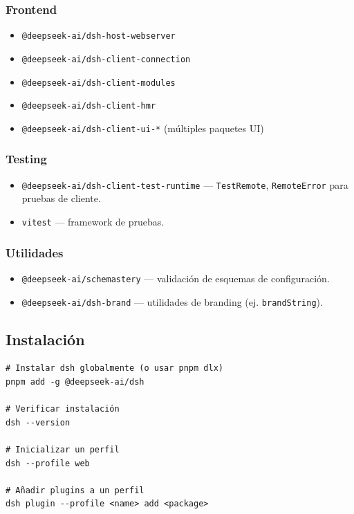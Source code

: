 \documentclass[11pt,a4paper]{article}
\begin{document}
\subsubsection*{Frontend}


\begin{itemize}[leftmargin=*,topsep=2pt,itemsep=1pt]
  \item \texttt{@deepseek-ai/dsh-host-webserver}
  \item \texttt{@deepseek-ai/dsh-client-connection}
  \item \texttt{@deepseek-ai/dsh-client-modules}
  \item \texttt{@deepseek-ai/dsh-client-hmr}
  \item \texttt{@deepseek-ai/dsh-client-ui-*} (múltiples paquetes UI)
\end{itemize}


\subsubsection*{Testing}


\begin{itemize}[leftmargin=*,topsep=2pt,itemsep=1pt]
  \item \texttt{@deepseek-ai/dsh-client-test-runtime} — \texttt{TestRemote}, \texttt{RemoteError} para pruebas de cliente.
  \item \texttt{vitest} — framework de pruebas.
\end{itemize}


\subsubsection*{Utilidades}


\begin{itemize}[leftmargin=*,topsep=2pt,itemsep=1pt]
  \item \texttt{@deepseek-ai/schemastery} — validación de esquemas de configuración.
  \item \texttt{@deepseek-ai/dsh-brand} — utilidades de branding (ej. \texttt{brandString}).
\end{itemize}


\subsection*{Instalación}


\begin{lstlisting}
# Instalar dsh globalmente (o usar pnpm dlx)
pnpm add -g @deepseek-ai/dsh

# Verificar instalación
dsh --version

# Inicializar un perfil
dsh --profile web

# Añadir plugins a un perfil
dsh plugin --profile <name> add <package>
\end{lstlisting}
\end{document}
